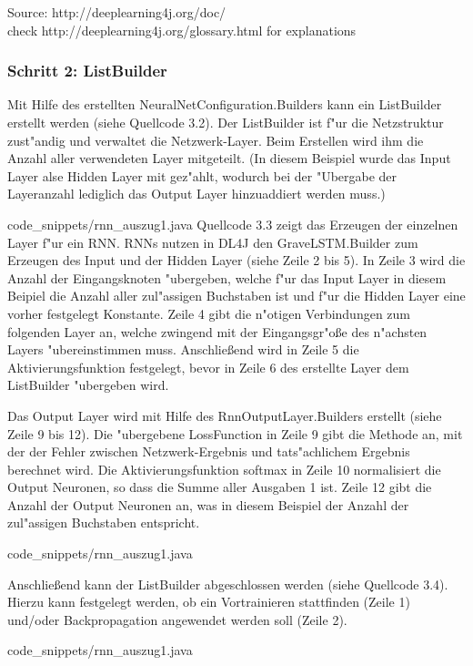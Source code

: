 {Source:
http://deeplearning4j.org/doc/ \\
check http://deeplearning4j.org/glossary.html for explanations

\subsubsection{Schritt 2: ListBuilder}
Mit Hilfe des erstellten NeuralNetConfiguration.Builders kann ein ListBuilder erstellt werden (siehe Quellcode 3.2). Der ListBuilder ist f"ur die Netzstruktur zust"andig und verwaltet die Netzwerk-Layer. Beim Erstellen wird ihm die Anzahl aller verwendeten Layer mitgeteilt. (In diesem Beispiel wurde das Input Layer alse Hidden Layer mit gez"ahlt, wodurch bei der "Ubergabe der Layeranzahl lediglich das Output Layer hinzuaddiert werden muss.)


{code_snippets/rnn_auszug1.java}
Quellcode 3.3 zeigt das Erzeugen der einzelnen Layer f"ur ein RNN. RNNs nutzen in DL4J den GraveLSTM.Builder zum Erzeugen des Input und der Hidden Layer (siehe Zeile 2 bis 5). In Zeile 3 wird die Anzahl der Eingangsknoten "ubergeben, welche f"ur das Input Layer in diesem Beipiel die Anzahl aller zul"assigen Buchstaben ist und f"ur die Hidden Layer eine vorher festgelegt Konstante. Zeile 4 gibt die n"otigen Verbindungen zum folgenden Layer an, welche zwingend mit der Eingangsgr"o{\ss}e des n"achsten Layers "ubereinstimmen muss. Anschlie{\ss}end wird in Zeile 5 die Aktivierungsfunktion festgelegt, bevor in Zeile 6 des erstellte Layer dem ListBuilder "ubergeben wird.

Das Output Layer wird mit Hilfe des RnnOutputLayer.Builders erstellt (siehe Zeile 9 bis 12). Die "ubergebene LossFunction in Zeile 9 gibt die Methode an, mit der der Fehler zwischen Netzwerk-Ergebnis und tats"achlichem Ergebnis berechnet wird. Die Aktivierungsfunktion \glqq softmax\grqq{} in Zeile 10 normalisiert die Output Neuronen, so dass die Summe aller Ausgaben 1 ist. Zeile 12 gibt die Anzahl der Output Neuronen an, was in diesem Beispiel der Anzahl der zul"assigen Buchstaben entspricht.


{code_snippets/rnn_auszug1.java}

Anschlie{\ss}end kann der ListBuilder abgeschlossen werden (siehe Quellcode 3.4). Hierzu kann festgelegt werden, ob ein Vortrainieren stattfinden (Zeile 1) und/oder Backpropagation angewendet werden soll (Zeile 2).

{code_snippets/rnn_auszug1.java}

}
